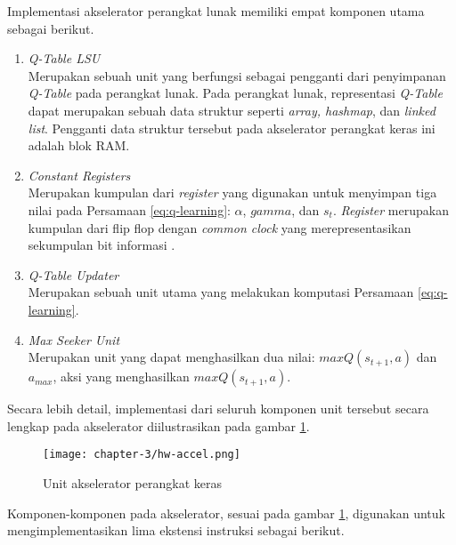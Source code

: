 Implementasi akselerator perangkat lunak memiliki empat komponen utama sebagai berikut.

\begin{enumerate}
	\item \textit{Q-Table \ac{LSU}}\\
	      Merupakan sebuah unit yang berfungsi sebagai pengganti dari penyimpanan \textit{Q-Table} pada perangkat lunak. Pada perangkat lunak, representasi \textit{Q-Table} dapat merupakan sebuah data struktur seperti \textit{array, hashmap}, dan \textit{linked list}. Pengganti data struktur tersebut pada akselerator perangkat keras ini adalah blok \ac{RAM}.
	\item \textit{Constant Registers}\\
	      Merupakan kumpulan dari \textit{register} yang digunakan untuk menyimpan tiga nilai pada Persamaan \ref{eq:q-learning}: $\alpha$, $gamma$, dan $s_t$. \textit{Register} merupakan kumpulan dari flip flop dengan \textit{common clock} yang merepresentasikan sekumpulan bit informasi \parencite{sarah2021digital}.
	\item \textit{Q-Table Updater}\\
	      Merupakan sebuah unit utama yang melakukan komputasi Persamaan \ref{eq:q-learning}.
	\item \textit{Max Seeker Unit}\\
	      Merupakan unit yang dapat menghasilkan dua nilai: $maxQ(s_{t+1},a)$ dan $a_{max}$, aksi yang menghasilkan $maxQ(s_{t+1},a)$.
\end{enumerate}


Secara lebih detail, implementasi dari seluruh komponen unit tersebut secara lengkap pada akselerator diilustrasikan pada gambar \ref{fig:hw-accel}.

\begin{figure}[H]
	\centering
	\texttt{[image: chapter-3/hw-accel.png]}
	\caption{Unit akselerator perangkat keras}
	\label{fig:hw-accel}
\end{figure}

Komponen-komponen pada akselerator, sesuai pada gambar \ref{fig:hw-accel}, digunakan untuk mengimplementasikan lima ekstensi instruksi sebagai berikut.

